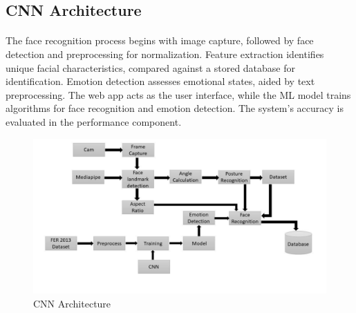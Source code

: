 \subsection{CNN Architecture}
\paragraph{}
The face recognition process begins with image capture, followed by face detection and preprocessing for normalization. Feature extraction identifies unique facial characteristics, compared against a stored database for identification. Emotion detection assesses emotional states, aided by text preprocessing. The web app acts as the user interface, while the ML model trains algorithms for face recognition and emotion detection. The system's accuracy is evaluated in the performance component.
\begin{figure}[!ht]
\centering
\includegraphics[width=125mm]{cnn arch.png}
\caption{CNN Architecture }
\end{figure}

